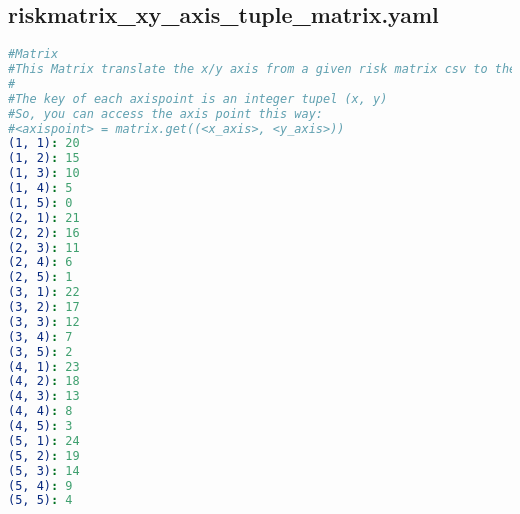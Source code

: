 
\subsection{riskmatrix\_xy\_axis\_tuple\_matrix.yaml}
\lstset{style=gra_codestyle}
\begin{lstlisting}[language=yaml, caption=Python LaTex - riskmatrix\_xy\_axis\_tuple\_matrix.yaml - Konfigurationsdatei - Risikomatrizen - X-Y-Achsen Tuples,captionpos=b,label={lst:riskmatrix_xy_axis_tuple_matrix},breaklines=true]
#Matrix
#This Matrix translate the x/y axis from a given risk matrix csv to the axispoint.
#
#The key of each axispoint is an integer tupel (x, y)
#So, you can access the axis point this way:
#<axispoint> = matrix.get((<x_axis>, <y_axis>))
(1, 1): 20
(1, 2): 15
(1, 3): 10
(1, 4): 5
(1, 5): 0
(2, 1): 21
(2, 2): 16
(2, 3): 11
(2, 4): 6
(2, 5): 1
(3, 1): 22
(3, 2): 17
(3, 3): 12
(3, 4): 7
(3, 5): 2
(4, 1): 23
(4, 2): 18
(4, 3): 13
(4, 4): 8
(4, 5): 3
(5, 1): 24
(5, 2): 19
(5, 3): 14
(5, 4): 9
(5, 5): 4
\end{lstlisting}